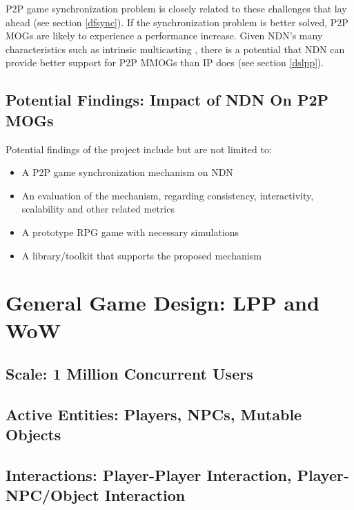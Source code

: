 \documentclass{article}
\begin{document}
P2P game synchronization problem is closely related to these challenges that lay ahead (see section \ref{dfsync}). If the synchronization problem is better solved, P2P MOGs are likely to experience a performance increase. Given NDN's many characteristics such as intrinsic multicasting \cite{Jndn}, there is a potential that NDN can provide better support for P2P MMOGs than IP does (see section \ref{dslpp}).

\subsection{Potential Findings: Impact of NDN On P2P MOGs}
Potential findings of the project include but are not limited to:
\begin{itemize}
\item A P2P game synchronization mechanism on NDN
\item An evaluation of the mechanism, regarding consistency, interactivity, scalability and other related metrics
\item A prototype RPG game with necessary simulations
\item A library/toolkit that supports the proposed mechanism
\end{itemize}

\section{General Game Design: LPP and WoW}
\label{ggd}

\subsection{Scale: 1 Million Concurrent Users}

\subsection{Active Entities: Players, NPCs, Mutable Objects}

\subsection{Interactions: Player-Player Interaction, Player-NPC/Object Interaction}
\end{document}
